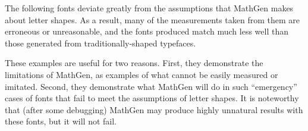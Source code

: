 
The following fonts deviate greatly from the assumptions that MathGen makes
about letter shapes. As a result, many of the measurements taken from them are
erroneous or unreasonable, and the fonts produced match much less well than
those generated from traditionally-shaped typefaces.

These examples are useful for two reasons. First, they demonstrate the
limitations of MathGen, as examples of what cannot be easily measured or
imitated. Second, they demonstrate what MathGen will do in such ``emergency''
cases of fonts that fail to meet the assumptions of letter shapes. It is
noteworthy that (after some debugging) MathGen may produce highly unnatural
results with these fonts, but it will not fail.


